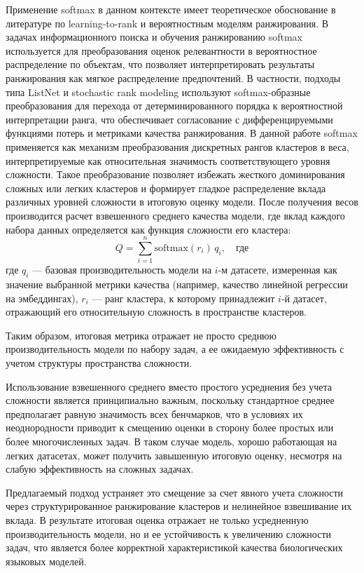 \documentclass[specification,annotation,times]{itmo-student-thesis}
\begin{document}
Применение softmax в данном контексте имеет теоретическое обоснование в литературе по learning-to-rank и вероятностным моделям ранжирования. В задачах информационного поиска и обучения ранжированию softmax используется для преобразования оценок релевантности в вероятностное распределение по объектам, что позволяет интерпретировать результаты ранжирования как мягкое распределение предпочтений. В частности, подходы типа ListNet и stochastic rank modeling используют softmax-образные преобразования для перехода от детерминированного порядка к вероятностной интерпретации ранга, что обеспечивает согласование с дифференцируемыми функциями потерь и метриками качества ранжирования.
В данной работе softmax применяется как механизм преобразования дискретных рангов кластеров в веса, интерпретируемые как относительная значимость соответствующего уровня сложности. Такое преобразование позволяет избежать жесткого доминирования сложных или легких кластеров и формирует гладкое распределение вклада различных уровней сложности в итоговую оценку модели.
После получения весов производится расчет взвешенного среднего качества модели, где вклад каждого набора данных определяется как функция сложности его кластера:
\[
Q = \sum_{i=1}^{n} \mathrm{softmax}(r_i)\, q_i,
\quad \text{где}
\]
где $q_i$ — базовая производительность модели на $i$-м датасете, измеренная как значение выбранной метрики качества (например, качество линейной регрессии на эмбеддингах), $r_i$ — ранг кластера, к которому принадлежит $i$-й датасет, отражающий его относительную сложность в пространстве кластеров.

Таким образом, итоговая метрика отражает не просто среднюю производительность модели по набору задач, а ее ожидаемую эффективность с учетом структуры пространства сложности.

Использование взвешенного среднего вместо простого усреднения без учета сложности является принципиально важным, поскольку стандартное среднее предполагает равную значимость всех бенчмарков, что в условиях их неоднородности приводит к смещению оценки в сторону более простых или более многочисленных задач. В таком случае модель, хорошо работающая на легких датасетах, может получить завышенную итоговую оценку, несмотря на слабую эффективность на сложных задачах.

Предлагаемый подход устраняет это смещение за счет явного учета сложности через структурированное ранжирование кластеров и нелинейное взвешивание их вклада. В результате итоговая оценка отражает не только усредненную производительность модели, но и ее устойчивость к увеличению сложности задач, что является более корректной характеристикой качества биологических языковых моделей.
\end{document}

